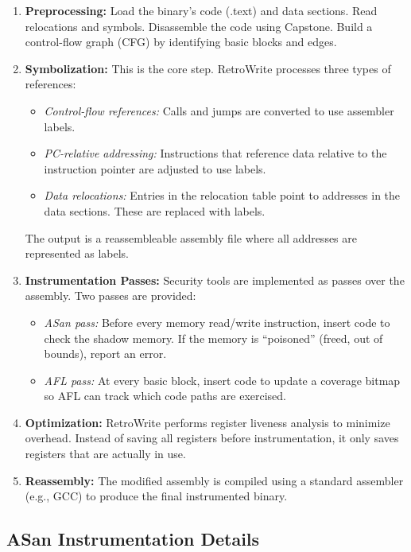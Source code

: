 \documentclass[10pt,a4paper]{article}
\begin{document}
\begin{enumerate}
    \item \textbf{Preprocessing:} Load the binary's code (.text) and data sections. Read relocations and symbols. Disassemble the code using Capstone. Build a control-flow graph (CFG) by identifying basic blocks and edges.

    \item \textbf{Symbolization:} This is the core step. RetroWrite processes three types of references:
    \begin{itemize}
        \item \textit{Control-flow references:} Calls and jumps are converted to use assembler labels.
        \item \textit{PC-relative addressing:} Instructions that reference data relative to the instruction pointer are adjusted to use labels.
        \item \textit{Data relocations:} Entries in the relocation table point to addresses in the data sections. These are replaced with labels.
    \end{itemize}
    The output is a reassembleable assembly file where all addresses are represented as labels.

    \item \textbf{Instrumentation Passes:} Security tools are implemented as passes over the assembly. Two passes are provided:
    \begin{itemize}
        \item \textit{ASan pass:} Before every memory read/write instruction, insert code to check the shadow memory. If the memory is ``poisoned'' (freed, out of bounds), report an error.
        \item \textit{AFL pass:} At every basic block, insert code to update a coverage bitmap so AFL can track which code paths are exercised.
    \end{itemize}

    \item \textbf{Optimization:} RetroWrite performs register liveness analysis to minimize overhead. Instead of saving all registers before instrumentation, it only saves registers that are actually in use.

    \item \textbf{Reassembly:} The modified assembly is compiled using a standard assembler (e.g., GCC) to produce the final instrumented binary.
\end{enumerate}

\subsection{ASan Instrumentation Details}
\end{document}
